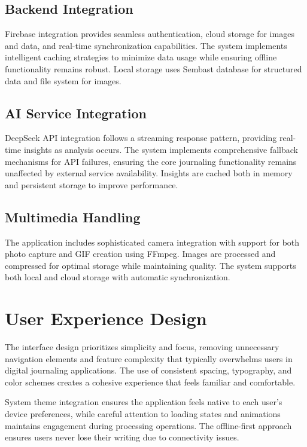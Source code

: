 \subsection{Backend Integration}

Firebase integration provides seamless authentication, cloud storage for images and data, and real-time synchronization capabilities. The system implements intelligent caching strategies to minimize data usage while ensuring offline functionality remains robust. Local storage uses Sembast database for structured data and file system for images.

\subsection{AI Service Integration}

DeepSeek API integration follows a streaming response pattern, providing real-time insights as analysis occurs. The system implements comprehensive fallback mechanisms for API failures, ensuring the core journaling functionality remains unaffected by external service availability. Insights are cached both in memory and persistent storage to improve performance.

\subsection{Multimedia Handling}

The application includes sophisticated camera integration with support for both photo capture and GIF creation using FFmpeg. Images are processed and compressed for optimal storage while maintaining quality. The system supports both local and cloud storage with automatic synchronization.

\section{User Experience Design}

The interface design prioritizes simplicity and focus, removing unnecessary navigation elements and feature complexity that typically overwhelms users in digital journaling applications. The use of consistent spacing, typography, and color schemes creates a cohesive experience that feels familiar and comfortable.

System theme integration ensures the application feels native to each user's device preferences, while careful attention to loading states and animations maintains engagement during processing operations. The offline-first approach ensures users never lose their writing due to connectivity issues.

